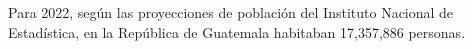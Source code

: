 Para 2022, según las proyecciones de población del Instituto Nacional de Estadística, en la República de Guatemala habitaban 17,357,886 personas. 